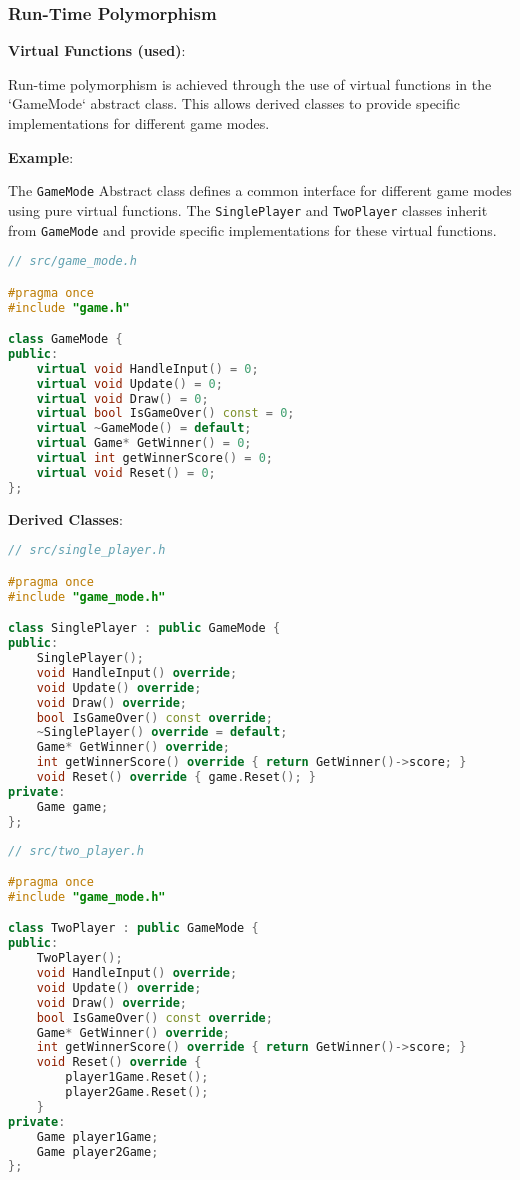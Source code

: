 \documentclass{article}
\begin{document}
\subsubsection{Run-Time Polymorphism}

\textbf{Virtual Functions (used)}:

Run-time polymorphism is achieved through the use of virtual functions in the `GameMode` abstract class. This allows derived classes to provide specific implementations for different game modes.

\textbf{Example}:

The \texttt{GameMode} Abstract class defines a common interface for different game modes using pure virtual functions. The \texttt{SinglePlayer} and \texttt{TwoPlayer} classes inherit from \texttt{GameMode} and provide specific implementations for these virtual functions.

\begin{lstlisting}[language=C++]
// src/game_mode.h

#pragma once
#include "game.h"

class GameMode {
public:
    virtual void HandleInput() = 0;
    virtual void Update() = 0;
    virtual void Draw() = 0;
    virtual bool IsGameOver() const = 0;
    virtual ~GameMode() = default;
    virtual Game* GetWinner() = 0;
    virtual int getWinnerScore() = 0;
    virtual void Reset() = 0;
};
\end{lstlisting}

\textbf{Derived Classes}:

\begin{lstlisting}[language=C++]
// src/single_player.h

#pragma once
#include "game_mode.h"

class SinglePlayer : public GameMode {
public:
    SinglePlayer();
    void HandleInput() override;
    void Update() override;
    void Draw() override;
    bool IsGameOver() const override;
    ~SinglePlayer() override = default;
    Game* GetWinner() override;
    int getWinnerScore() override { return GetWinner()->score; }
    void Reset() override { game.Reset(); }
private:
    Game game;
};
\end{lstlisting}

\begin{lstlisting}[language=C++]
// src/two_player.h

#pragma once
#include "game_mode.h"

class TwoPlayer : public GameMode {
public:
    TwoPlayer();
    void HandleInput() override;
    void Update() override;
    void Draw() override;
    bool IsGameOver() const override;
    Game* GetWinner() override;
    int getWinnerScore() override { return GetWinner()->score; }
    void Reset() override { 
        player1Game.Reset(); 
        player2Game.Reset(); 
    }
private:
    Game player1Game;
    Game player2Game;
};
\end{lstlisting}
\end{document}
